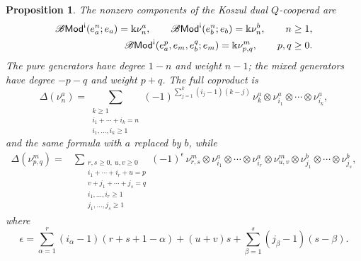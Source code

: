 \documentclass[11pt,letterpaper]{article}
\numberwithin{equation}{section}
\theoremstyle{plain}
\newtheorem{prop}[thm]{Proposition}
\theoremstyle{definition}
\theoremstyle{remark}
\newcommand{\antishriek}{%
	\mathord{\mathchoice
		{\rotatebox[origin=c]{180}{$\displaystyle !$}}
		{\rotatebox[origin=c]{180}{$\textstyle !$}}
		{\rotatebox[origin=c]{180}{$\scriptstyle !$}}
		{\rotatebox[origin=c]{180}{$\scriptscriptstyle !$}}}}
\begin{document}
\begin{prop}
\label{prop_koszul_dual_BMod}
The nonzero components of the Koszul dual $Q$-cooperad are
\begin{equation}
\label{eq_BMod_cooperad}
\begin{aligned}
\mathscr B\mathsf{Mod}^{\antishriek}(e_a^n;e_a)
=
\Bbbk\nu_n^a,
\qquad
\mathscr B\mathsf{Mod}^{\antishriek}(e_b^n;e_b)
=
\Bbbk\nu_n^b,
\qquad n\geq1,
\\
\mathscr B\mathsf{Mod}^{\antishriek}
(e_a^p,e_m,e_b^q;e_m)
=
\Bbbk\nu_{p,q}^m,
\qquad p,q\geq0.
\end{aligned}
\end{equation}
The pure generators have degree $1-n$ and weight $n-1$; the mixed
generators have degree $-p-q$ and weight $p+q$. The full coproduct is
\begin{equation}
\label{eq_full_comultiplication_nu_a}
\Delta(\nu_n^a)
=
\sum_{\substack{
k\geq1\\
i_1+\cdots+i_k=n\\
i_1,\ldots,i_k\geq1
}}
(-1)^{	\sum_{j=1}^k
(i_j-1)(k-j) }
\,
\nu_k^a
\otimes
\nu_{i_1}^a
\otimes\cdots\otimes
\nu_{i_k}^a,
\end{equation}
and the same formula with $a$ replaced by $b$, while
\begin{equation}
\label{eq_full_comultiplication_nu_m}
\begin{aligned}
\Delta(\nu_{p,q}^m)
={}&
\sum_{\substack{
r,s\geq0,\ u,v\geq0\\
i_1+\cdots+i_r+u=p\\
v+j_1+\cdots+j_s=q\\
i_1,\ldots,i_r\geq1\\
j_1,\ldots,j_s\geq1
}}
(-1)^{\epsilon}
\,
\nu_{r,s}^m
\otimes
\nu_{i_1}^a\otimes\cdots\otimes\nu_{i_r}^a
\otimes
\nu_{u,v}^m
\otimes
\nu_{j_1}^b\otimes\cdots\otimes\nu_{j_s}^b,
\end{aligned}
\end{equation}
where
\begin{equation}
\label{eq_epsilon_comultiplication_nu_m}
\epsilon
=
\sum_{\alpha=1}^{r}
(i_\alpha-1)(r+s+1-\alpha)
+
(u+v)s
+
\sum_{\beta=1}^{s}
(j_\beta-1)(s-\beta).
\end{equation}
\end{prop}
\end{document}
